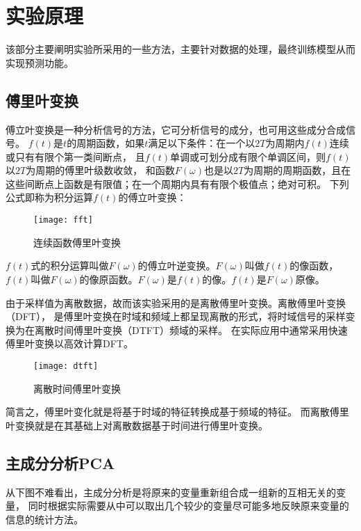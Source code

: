 \section{实验原理}

该部分主要阐明实验所采用的一些方法，主要针对数据的处理，最终训练模型从而实现预测功能。

\subsection{傅里叶变换}

傅立叶变换是一种分析信号的方法，它可分析信号的成分，也可用这些成分合成信号。
$f(t)$是$t$的周期函数，如果$t$满足以下条件：在一个以$2T$为周期内$f(t)$连续或只有有限个第一类间断点，
且$f(t)$单调或可划分成有限个单调区间，则$f(t)$以$2T$为周期的傅里叶级数收敛，
和函数$F(\omega)$也是以$2T$为周期的周期函数，且在这些间断点上函数是有限值；在一个周期内具有有限个极值点；绝对可积。
下列公式即称为积分运算$f(t)$的傅立叶变换：

\begin{figure}[ht]
	\centering
	\texttt{[image: fft]}
	\caption{连续函数傅里叶变换}
	\label{fig:fft}
\end{figure}

$f(t)$式的积分运算叫做$F(\omega)$的傅立叶逆变换。$F(\omega)$叫做$f(t)$的像函数，
$f(t)$叫做$F(\omega)$的像原函数。$F(\omega)$是$f(t)$的像。$f(t)$是$F(\omega)$原像。

由于采样值为离散数据，故而该实验采用的是离散傅里叶变换。离散傅里叶变换（DFT），
是傅里叶变换在时域和频域上都呈现离散的形式，将时域信号的采样变换为在离散时间傅里叶变换（DTFT）频域的采样。
在实际应用中通常采用快速傅里叶变换以高效计算DFT。

\begin{figure}[ht]
	\centering
	\texttt{[image: dtft]}
	\caption{离散时间傅里叶变换}
	\label{fig:dtft}
\end{figure}

简言之，傅里叶变化就是将基于时域的特征转换成基于频域的特征。
而离散傅里叶变换就是在其基础上对离散数据基于时间进行傅里叶变换。

\subsection{主成分分析PCA}

从下图不难看出，主成分分析是将原来的变量重新组合成一组新的互相无关的变量，
同时根据实际需要从中可以取出几个较少的变量尽可能多地反映原来变量的信息的统计方法。


